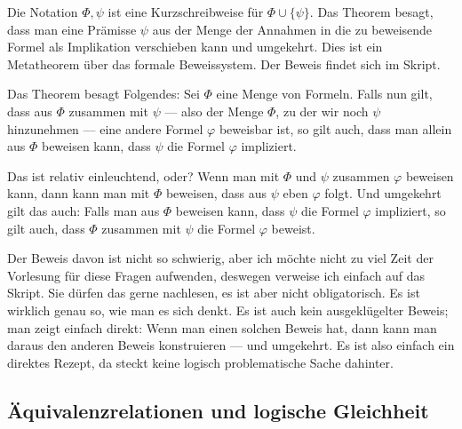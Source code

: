 \begin{math-stroke}

\begin{explanation-of-steps}
Die Notation $\Phi, \psi$ ist eine Kurzschreibweise für $\Phi \cup \{\psi\}$. Das Theorem besagt, dass man eine Prämisse $\psi$ aus der Menge der Annahmen in die zu beweisende Formel als Implikation verschieben kann und umgekehrt. Dies ist ein Metatheorem über das formale Beweissystem. Der Beweis findet sich im Skript.
\end{explanation-of-steps}
\end{math-stroke}

\begin{spoken-clean}[00:48:37 - 00:51:37]
Das Theorem besagt Folgendes: Sei $\Phi$ eine Menge von Formeln. Falls nun gilt, dass aus $\Phi$ zusammen mit $\psi$ --- also der Menge $\Phi$, zu der wir noch $\psi$ hinzunehmen --- eine andere Formel $\varphi$ beweisbar ist, so gilt auch, dass man allein aus $\Phi$ beweisen kann, dass $\psi$ die Formel $\varphi$ impliziert.

Das ist relativ einleuchtend, oder? Wenn man mit $\Phi$ und $\psi$ zusammen $\varphi$ beweisen kann, dann kann man mit $\Phi$ beweisen, dass aus $\psi$ eben $\varphi$ folgt. Und umgekehrt gilt das auch: Falls man aus $\Phi$ beweisen kann, dass $\psi$ die Formel $\varphi$ impliziert, so gilt auch, dass $\Phi$ zusammen mit $\psi$ die Formel $\varphi$ beweist.

Der Beweis davon ist nicht so schwierig, aber ich möchte nicht zu viel Zeit der Vorlesung für diese Fragen aufwenden, deswegen verweise ich einfach auf das Skript. Sie dürfen das gerne nachlesen, es ist aber nicht obligatorisch. Es ist wirklich genau so, wie man es sich denkt. Es ist auch kein ausgeklügelter Beweis; man zeigt einfach direkt: Wenn man einen solchen Beweis hat, dann kann man daraus den anderen Beweis konstruieren --- und umgekehrt. Es ist also einfach ein direktes Rezept, da steckt keine logisch problematische Sache dahinter.
\end{spoken-clean}

\subsection{Äquivalenzrelationen und logische Gleichheit}

